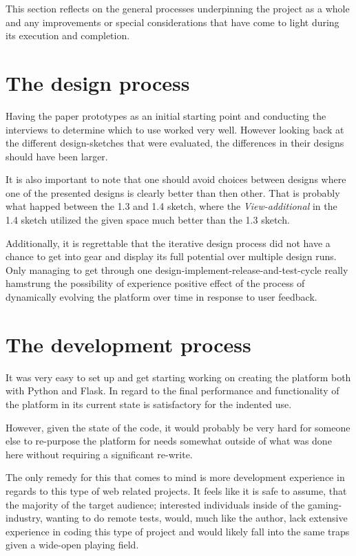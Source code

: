 
This section reflects on the general processes underpinning the project as a
whole and any improvements or special considerations that have come to light
during its execution and completion.

\section{The design process}

  Having the paper prototypes as an initial starting point and conducting
  the interviews to determine which to use worked very well. However looking
	back at the different design-sketches that were evaluated, the differences in
	their designs should have been larger.

	It is also important to note that one should avoid choices between designs
	where one of the presented designs is clearly better than then other.
	That is probably what happed between the 1.3 and 1.4 sketch, where the
	\textit{View-additional} in the 1.4 sketch utilized the given space much
	better than the 1.3 sketch.

	Additionally, it is regrettable that the iterative design process did not
	have a chance to get into gear and display its full potential over multiple
	design runs. Only managing to get through one
	design-implement-release-and-test-cycle really hamstrung the possibility of
	experience positive effect of the process of dynamically evolving the
	platform over time in response to user feedback.

\newpage
\section{The development process}

  It was very easy to set up and get starting working on creating the platform
  both with Python and Flask. In regard to the final performance and
  functionality of the platform in its current state is satisfactory for the
  indented use.

  However, given the state of the code, it would probably be very hard for
  someone else to re-purpose the platform for needs somewhat outside of what
  was done here without requiring a significant re-write.

  The only remedy for this that comes to mind is more development experience in
  regards to this type of web related projects. It feels like it is safe to
  assume, that the majority of the target audience; interested individuals
  inside of the gaming-industry, wanting to do remote tests, would, much like
  the author, lack extensive experience in coding this type of project and
  would likely fall into the same traps given a wide-open playing field.

